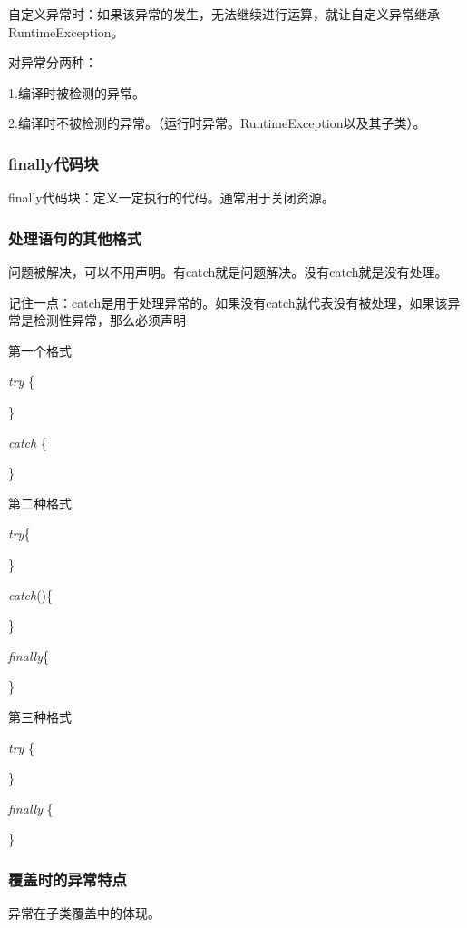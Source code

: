 \documentclass[UTF8]{ctexart}
\begin{document}
自定义异常时：如果该异常的发生，无法继续进行运算，就让自定义异常继承RuntimeException。

对异常分两种：

1.编译时被检测的异常。

2.编译时不被检测的异常。（运行时异常。RuntimeException以及其子类）。

\subsubsection{finally代码块}

finally代码块：定义一定执行的代码。通常用于关闭资源。	


\subsubsection{处理语句的其他格式}

问题被解决，可以不用声明。有catch就是问题解决。没有catch就是没有处理。

记住一点：catch是用于处理异常的。如果没有catch就代表没有被处理，如果该异常是检测性异常，那么必须声明

\textbullet 第一个格式

\textit{try} \{
		
	
	
	\}

\textit{catch} \{
	


	\}

\textbullet 第二种格式

\textit{try}\{

\}

\textit{catch}()\{

\}

\textit{finally}\{

\}

\textbullet 第三种格式

\textit{try} \{

\}

\textit{finally} \{

\}


\subsubsection{覆盖时的异常特点}

异常在子类覆盖中的体现。
\end{document}
